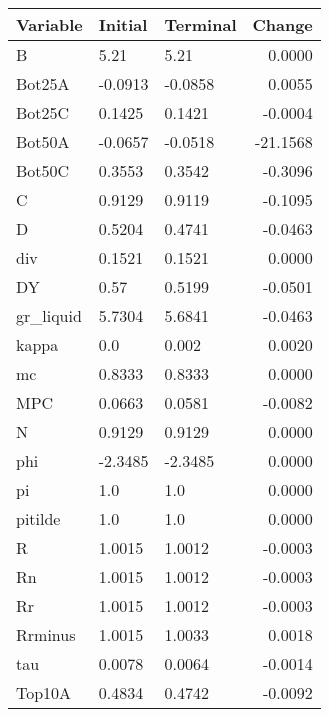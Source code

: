 \begin{table}
\centering
\label{tab:stst_comparison_slow_shock_wedge_permanent}
\begin{tabular}{lllr}
\toprule
                Variable & Initial & Terminal &   Change \\
\midrule
                       B &    5.21 &     5.21 &   0.0000 \\
                  Bot25A & -0.0913 &  -0.0858 &   0.0055 \\
                  Bot25C &  0.1425 &   0.1421 &  -0.0004 \\
                  Bot50A & -0.0657 &  -0.0518 & -21.1568 \\
                  Bot50C &  0.3553 &   0.3542 &  -0.3096 \\
                       C &  0.9129 &   0.9119 &  -0.1095 \\
                       D &  0.5204 &   0.4741 &  -0.0463 \\
                     div &  0.1521 &   0.1521 &   0.0000 \\
                      DY &    0.57 &   0.5199 &  -0.0501 \\
               gr\_liquid &  5.7304 &   5.6841 &  -0.0463 \\
                   kappa &     0.0 &    0.002 &   0.0020 \\
                      mc &  0.8333 &   0.8333 &   0.0000 \\
                     MPC &  0.0663 &   0.0581 &  -0.0082 \\
                       N &  0.9129 &   0.9129 &   0.0000 \\
                     phi & -2.3485 &  -2.3485 &   0.0000 \\
                      pi &     1.0 &      1.0 &   0.0000 \\
                 pitilde &     1.0 &      1.0 &   0.0000 \\
                       R &  1.0015 &   1.0012 &  -0.0003 \\
                      Rn &  1.0015 &   1.0012 &  -0.0003 \\
                      Rr &  1.0015 &   1.0012 &  -0.0003 \\
                 Rrminus &  1.0015 &   1.0033 &   0.0018 \\
                     tau &  0.0078 &   0.0064 &  -0.0014 \\
                  Top10A &  0.4834 &   0.4742 &  -0.0092 \\

\end{tabular}
\end{table}
